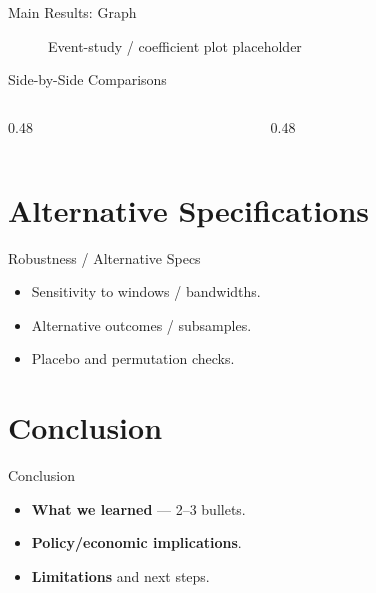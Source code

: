 \documentclass[aspectratio=169,professionalfonts]{beamer}
\newcommand{\hl}[1]{\textbf{\textcolor{UGARed}{#1}}}
\newcommand{\figph}[2][0.9\linewidth]{%
  \begin{figure}
    \centering
    \fbox{\rule{0pt}{0.55#1}\rule{#1}{0pt}}%
    \caption{#2}
  \end{figure}
}
\begin{document}
\begin{frame}{Main Results: Graph}
  \figph{Event-study / coefficient plot placeholder}
\end{frame}

\begin{frame}{Side-by-Side Comparisons}
  \begin{columns}[T,onlytextwidth]
    \begin{column}{0.48\linewidth}
    \end{column}
    \begin{column}{0.48\linewidth}
    \end{column}
  \end{columns}
\end{frame}

\section{Alternative Specifications}

\begin{frame}{Robustness / Alternative Specs}
  \begin{itemize}
    \item Sensitivity to windows / bandwidths.
    \item Alternative outcomes / subsamples.
    \item Placebo and permutation checks.
  \end{itemize}
\end{frame}

\section{Conclusion}

\begin{frame}{Conclusion}
  \begin{itemize}
    \item \hl{What we learned} — 2–3 bullets.
    \item \hl{Policy/economic implications}.
    \item \hl{Limitations} and next steps.
  \end{itemize}
\end{frame}
\end{document}
